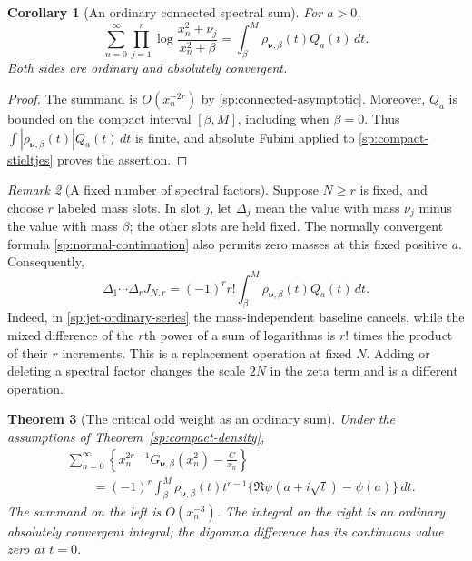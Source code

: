 \documentclass[11pt,letterpaper]{article}
\numberwithin{equation}{section}
\newtheorem{theorem}{Theorem}[section]
\newtheorem{corollary}[theorem]{Corollary}
\theoremstyle{definition}
\theoremstyle{remark}
\newtheorem{remark}[theorem]{Remark}
\begin{document}
\begin{corollary}[An ordinary connected spectral sum]
\label{sp:ordinary-connected}
For $a>0$,
\begin{equation}
 \sum_{n=0}^{\infty}
   \prod_{j=1}^{r}\log\frac{x_n^2+\nu_j}{x_n^2+\beta}
 =\int_\beta^M\rho_{\boldsymbol\nu,\beta}(t)Q_a(t)\,dt.
 \label{sp:connected-sum}
\end{equation}
Both sides are ordinary and absolutely convergent.
\end{corollary}

\begin{proof}
The summand is $O(x_n^{-2r})$ by
\eqref{sp:connected-asymptotic}.  Moreover, $Q_a$ is bounded on
the compact interval $[\beta,M]$, including when $\beta=0$.
Thus $\int|\rho_{\boldsymbol\nu,\beta}(t)|Q_a(t)\,dt$ is finite,
and absolute Fubini applied to
\eqref{sp:compact-stieltjes} proves the assertion.
\end{proof}

\begin{remark}[A fixed number of spectral factors]
\label{sp:fixed-N-differences}
Suppose $N\geq r$ is fixed, and choose $r$ labeled mass slots.
In slot $j$, let $\Delta_j$ mean the value with mass $\nu_j$
minus the value with mass $\beta$; the other slots are held
fixed.  The normally convergent formula
\eqref{sp:normal-continuation} also permits zero masses at this
fixed positive $a$.  Consequently,
\begin{equation}
 \Delta_1\cdots\Delta_r J_{N,r}
 =(-1)^r r!\int_\beta^M
                    \rho_{\boldsymbol\nu,\beta}(t)Q_a(t)\,dt.
 \label{sp:connected-finite-difference}
\end{equation}
Indeed, in \eqref{sp:jet-ordinary-series} the mass-independent
baseline cancels, while the mixed difference of the $r$th power
of a sum of logarithms is $r!$ times the product of their $r$
increments.  This is a replacement operation at fixed $N$.
Adding or deleting a spectral factor changes the scale $2N$ in
the zeta term and is a different operation.
\end{remark}

\begin{theorem}[The critical odd weight as an ordinary sum]
\label{sp:critical-weight}
Under the assumptions of Theorem~\ref{sp:compact-density},
\begin{equation}
 \boxed{\begin{aligned}
 &\sum_{n=0}^{\infty}\left\{
        x_n^{2r-1}G_{\boldsymbol\nu,\beta}(x_n^2)-\frac{C}{x_n}
                         \right\}\\
 &\qquad=(-1)^r\int_\beta^M
       \rho_{\boldsymbol\nu,\beta}(t)t^{r-1}
       \{\Re\psi(a+i\sqrt t)-\psi(a)\}\,dt.
 \end{aligned}}
 \label{sp:critical-ordinary-sum}
\end{equation}
The summand on the left is $O(x_n^{-3})$.  The integral on the
right is an ordinary absolutely convergent integral; the
digamma difference has its continuous value zero at $t=0$.
\end{theorem}
\end{document}

